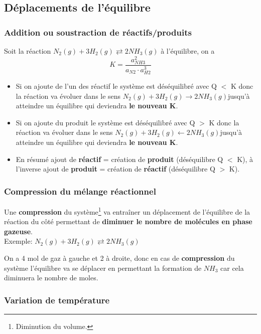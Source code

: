 \documentclass[10pt,a4paper]{book}
\begin{document}
\subsection{Déplacements de l'équilibre}

\subsubsection{Addition ou soustraction de réactifs/produits}

Soit la réaction \(N_2(g) + 3H_2(g) \rightleftarrows 2NH_3(g)\) à l'équilibre, on a 
\[K = \frac{a_{NH3}^2}{a_{N2}\cdot a_{H2}^3}\]
\begin{itemize}
\item Si on ajoute de l'un des réactif le système est déséquilibré avec Q $<$ K donc la réaction va évoluer dans le sens \(N_2(g) + 3H_2(g) \rightarrow 2NH_3(g)\)jusqu'à atteindre un équilibre qui deviendra \textbf{le nouveau K}.
\item  Si on ajoute du produit le système est déséquilibré avec Q $>$ K donc la réaction va évoluer dans le sens \(N_2(g) + 3H_2(g) \leftarrow 2NH_3(g)\)jusqu'à atteindre un équilibre qui deviendra \textbf{le nouveau K}.
\item En résumé ajout de \textbf{réactif} = création de \textbf{produit} (déséquilibre Q $<$ K), à l'inverse ajout de \textbf{produit} = création de \textbf{réactif} (déséquilibre Q $>$ K).
\end{itemize}

\subsubsection{Compression du mélange réactionnel}

Une \textbf{compression} du système\footnote{Diminution du volume.} va entraîner un déplacement de l'équilibre de la réaction du côté permettant de \textbf{diminuer le nombre de molécules en phase gazeuse}. \\
Exemple: \(N_2(g) + 3H_2(g) \rightleftarrows 2NH_3(g)\) \par
On a 4 mol de gaz à gauche et 2 à droite, donc en cas de \textbf{compression} du système l'équilibre va se déplacer en permettant la formation de $NH_3$ car cela diminuera le nombre de moles.

\subsubsection{Variation de température}
\end{document}
